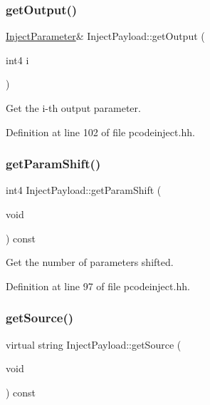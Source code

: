\subsubsection{\texorpdfstring{getOutput()}{getOutput()}}
{\footnotesize\ttfamily \mbox{\hyperlink{class_inject_parameter}{Inject\+Parameter}}\& Inject\+Payload\+::get\+Output (\begin{DoxyParamCaption}\item[{int4}]{i }\end{DoxyParamCaption})\hspace{0.3cm}{\ttfamily [inline]}}



Get the i-\/th output parameter. 



Definition at line 102 of file pcodeinject.\+hh.

\mbox{\label{class_inject_payload_ab4d3acac3d46171c7d51f40c835d65c3}} 
\subsubsection{\texorpdfstring{getParamShift()}{getParamShift()}}
{\footnotesize\ttfamily int4 Inject\+Payload\+::get\+Param\+Shift (\begin{DoxyParamCaption}\item[{void}]{ }\end{DoxyParamCaption}) const\hspace{0.3cm}{\ttfamily [inline]}}



Get the number of parameters shifted. 



Definition at line 97 of file pcodeinject.\+hh.

\mbox{\label{class_inject_payload_aee01fa71c361b38625bdc15badaee7bc}} 
\subsubsection{\texorpdfstring{getSource()}{getSource()}}
{\footnotesize\ttfamily virtual string Inject\+Payload\+::get\+Source (\begin{DoxyParamCaption}\item[{void}]{ }\end{DoxyParamCaption}) const\hspace{0.3cm}{\ttfamily [pure virtual]}}



